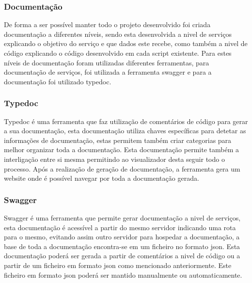 \subsubsection{Documentação}
De forma a ser possível manter todo o projeto desenvolvido foi criada documentação a diferentes níveis, sendo esta desenvolvida a nivel de serviços explicando o objetivo do serviço e que dados este recebe, como também a nivel de código explicando o código desenvolvido em cada script existente. Para estes níveis de documentação foram utilizadas diferentes ferramentas, para documentação de serviços, foi utilizada a ferramenta swagger e para a documentação foi utilizado typedoc.

\subsubsection{Typedoc}
Typedoc é uma ferramenta que faz utilização de comentários de código para gerar a sua documentação, esta documentação utiliza chaves específicas para detetar as informações de documentação, estas permitem também criar categorias para melhor organizar toda a documentação. Esta documentação permite também a interligação entre si mesma permitindo ao visualizador desta seguir todo o processo. Após a realização de geração de documentação, a ferramenta gera um website onde é possível navegar por toda a documentação gerada.

\newpage

\subsubsection{Swagger}
Swagger é uma ferramenta que permite gerar documentação a nivel de serviços, esta documentação é acessível a partir do mesmo servidor indicando uma rota para o mesmo, evitando assim outro servidor para hospedar a documentação, a base de toda a documentação encontra-se em um ficheiro no formato json. Esta documentação poderá ser gerada a partir de comentários a nivel de código ou a partir de um ficheiro em formato json como mencionado anteriormente. Este ficheiro em formato json poderá ser mantido manualmente ou automaticamente.